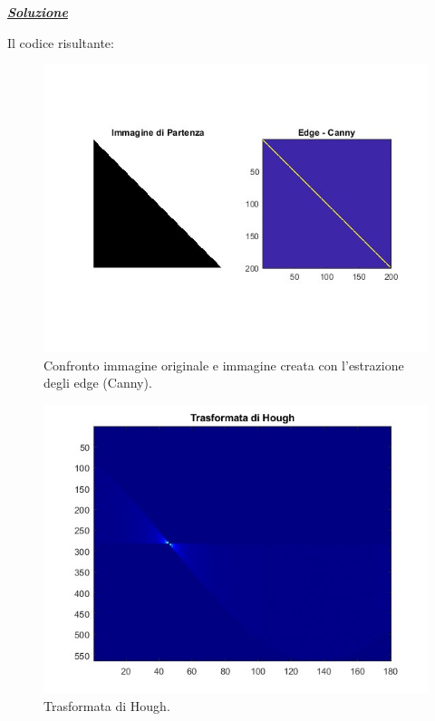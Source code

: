 \documentclass[a4paper]{article}
\begin{document}
	\noindent
	\textcolor{Green4}{\textbf{\emph{\underline{Soluzione}}}}\newline
	
	\noindent
	Il codice risultante:
	\newpage
	
	\begin{figure}[!htp]
		\centering
		\includegraphics[width=\textwidth]{img/lab/operato-locali-19.jpg}
		\caption{Confronto immagine originale e immagine creata con l'estrazione degli edge (Canny).}
	\end{figure}
	\begin{figure}[!htp]
		\centering
		\includegraphics[width=.9\textwidth]{img/lab/operato-locali-20.jpg}
		\caption{Trasformata di Hough.}
	\end{figure}\newpage
	
\end{document}
